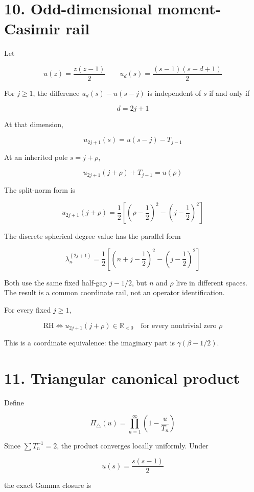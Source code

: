 \documentclass[
  11pt,
]{book}
\begin{document}
\section{10. Odd-dimensional moment-Casimir
rail}\label{odd-dimensional-moment-casimir-rail}

Let

\[
u(z)=\frac{z(z-1)}2
\qquad
u_d(s)=\frac{(s-1)(s-d+1)}2
\]

For \(j\ge1\), the difference \(u_d(s)-u(s-j)\) is independent of \(s\)
if and only if

\[
\boxed{d=2j+1}
\]

At that dimension,

\[
\boxed{
u_{2j+1}(s)=u(s-j)-T_{j-1}
}
\]

At an inherited pole \(s=j+\rho\),

\[
u_{2j+1}(j+\rho)+T_{j-1}=u(\rho)
\]

The split-norm form is

\[
\boxed{
u_{2j+1}(j+\rho)
=\frac12\left[
\left(\rho-\frac12\right)^2
-\left(j-\frac12\right)^2
\right]
}
\]

The discrete spherical degree value has the parallel form

\[
\lambda_n^{(2j+1)}
=\frac12\left[
\left(n+j-\frac12\right)^2
-\left(j-\frac12\right)^2
\right]
\]

Both use the same fixed half-gap \(j-1/2\), but \(n\) and \(\rho\) live
in different spaces. The result is a common coordinate rail, not an
operator identification.

For every fixed \(j\ge1\),

\[
\mathrm{RH}
\iff
u_{2j+1}(j+\rho)\in\mathbb R_{<0}
\quad\text{for every nontrivial zero }\rho
\]

This is a coordinate equivalence: the imaginary part is
\(\gamma(\beta-1/2)\).

\section{11. Triangular canonical
product}\label{triangular-canonical-product}

Define

\[
\Pi_\triangle(u)=\prod_{n=1}^{\infty}
\left(1-\frac{u}{T_n}\right)
\]

Since \(\sum T_n^{-1}=2\), the product converges locally uniformly.
Under

\[
u(s)=\frac{s(s-1)}2
\]

the exact Gamma closure is
\end{document}
